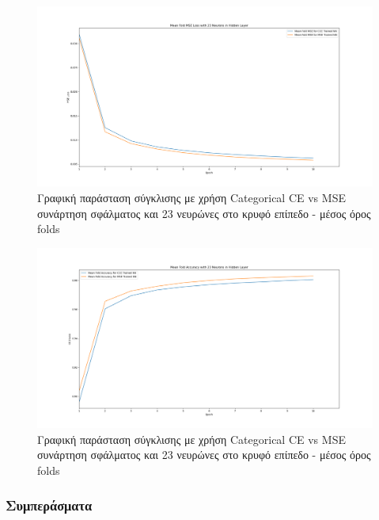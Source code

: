 \documentclass[12pt,a4paper]{article}
\begin{document}
\begin{figure}[H]
	\includegraphics[width=\textwidth]{17. CCE vs MSE - MSE Loss - 23 Neurons - Mean.png}
	\caption{Γραφική παράσταση σύγκλισης με χρήση Categorical CE vs MSE συνάρτηση σφάλματος και 23 νευρώνες στο κρυφό επίπεδο - μέσος όρος folds}
\end{figure}

\begin{figure}[H]
	\includegraphics[width=\textwidth]{18. CCE vs MSE - Accuracy - 23 Neurons - Mean.png}
	\caption{Γραφική παράσταση σύγκλισης με χρήση Categorical CE vs MSE συνάρτηση σφάλματος και 23 νευρώνες στο κρυφό επίπεδο - μέσος όρος folds}
\end{figure}

\subsubsection{Συμπεράσματα}
\end{document}
